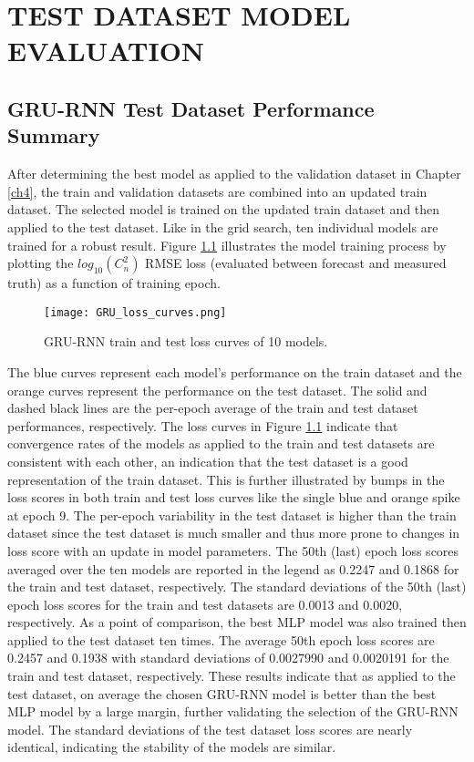 \chapter{TEST DATASET MODEL EVALUATION}
\label{ch5}

\section{GRU-RNN Test Dataset Performance Summary}
After determining the best model  as applied to the validation dataset in Chapter \ref{ch4}, the train and validation datasets are combined into an updated train dataset. The selected model is trained on the updated train dataset and then applied to the test dataset. Like in the grid search, ten individual models are trained for a robust result. Figure \ref{fig:GRU_train_test_loss_curves} illustrates the model training process by plotting the $log_{10}(C_{n}^{2})$ RMSE loss (evaluated between forecast and measured truth) as a function of training epoch.
\begin{figure}[h!]
	\centering
	\texttt{[image: GRU\_loss\_curves.png]}
	\caption{GRU-RNN train and test loss curves of 10 models.}
	\label{fig:GRU_train_test_loss_curves}
\end{figure}
The blue curves represent each model's performance on the train dataset and the orange curves represent the performance on the test dataset. The solid and dashed black lines are the per-epoch average of the train and test dataset performances, respectively. The loss curves in Figure \ref{fig:GRU_train_test_loss_curves} indicate that convergence rates of the models as applied to the train and test datasets are consistent with each other, an indication that the test dataset is a good representation of the train dataset. This is further illustrated by bumps in the loss scores in both train and test loss curves like the single blue and orange spike at epoch 9. The per-epoch variability in the test dataset is higher than the train dataset since the test dataset is much smaller and thus more prone to changes in loss score with an update in model parameters. The 50th (last) epoch loss scores averaged over the ten models are reported in the legend as 0.2247 and 0.1868 for the train and test dataset, respectively. The standard deviations of the 50th (last) epoch loss scores for the train and test datasets are 0.0013 and 0.0020, respectively. As a point of comparison, the best \ac{MLP} model was also trained then applied to the test dataset ten times. The average 50th epoch loss scores are 0.2457 and 0.1938 with standard deviations of 0.0027990 and 0.0020191 for the train and test dataset, respectively. These results indicate that as applied to the test dataset, on average the chosen \ac{GRU-RNN} model is better than the best \ac{MLP} model by a large margin, further validating the selection of the \ac{GRU-RNN} model. The standard deviations of the test dataset loss scores are nearly identical, indicating the stability of the models are similar.

